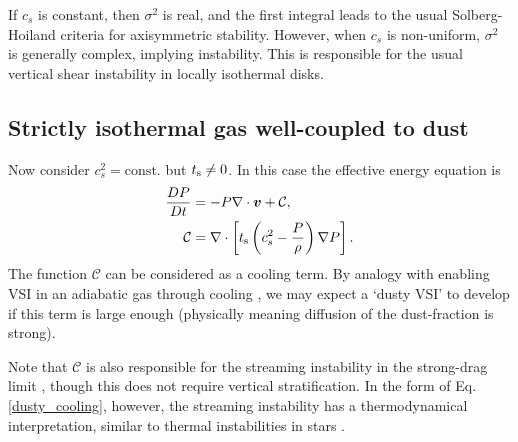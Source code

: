 If $c_s$ is constant, then $\sigma^2$ is real, and 
the first integral leads to the usual Solberg-Hoiland criteria for
axisymmetric stability. However, when $c_s$ is non-uniform, $\sigma^2$
is generally complex, implying instability. This is responsible for
the usual vertical shear instability in locally isothermal disks. 

\subsection{Strictly isothermal gas well-coupled to dust} 
Now consider $c_s^2=\mathrm{const.}$ but $t_\mathrm{s}\neq0$. In this case
the effective energy equation is 
\begin{align}\label{dusty_cooling}
  \frac{DP}{Dt} &= - P \nabla \cdot \bm{v} + \mathcal{C},\\
  \mathcal{C} & = \nabla\cdot\left[t_\mathrm{s}\left(c_s^2 -
    \frac{P}{\rho}\right)\nabla P\right].           
\end{align} 
The function $\mathcal{C}$ can be considered as a cooling term. By
analogy with enabling VSI in an adiabatic gas through cooling
\citep{nelson13,lin15}, we may expect a `dusty VSI' to develop 
if this term is large enough (physically meaning diffusion of the
dust-fraction is strong). 


Note that $\mathcal{C}$ is also responsible for the streaming
instability  in the strong-drag limit \citep{laibe14}, though this
does not require vertical stratification. In the form of
Eq. \ref{dusty_cooling}, however, the streaming instability has a
thermodynamical interpretation, similar to thermal instabilities in
stars \citep{latter06}.  
